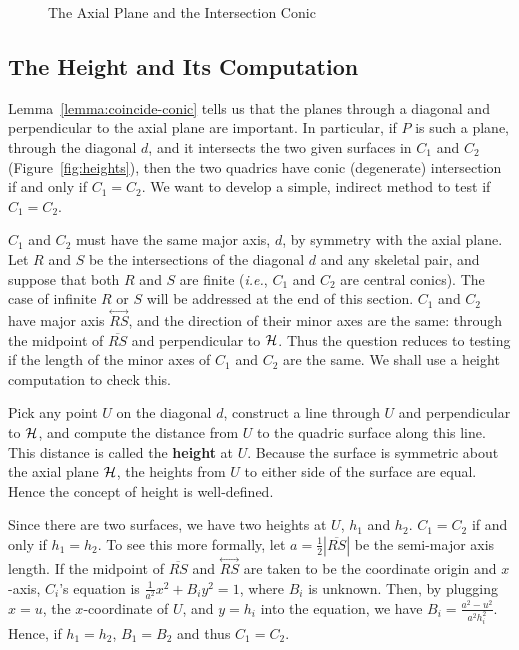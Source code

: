 \begin{figure}
\vspace{4.5cm}
\caption{The Axial Plane and the Intersection Conic}
\label{fig:major}
\end{figure}




\subsection{The Height and Its Computation}
\label{section:height}

     Lemma~\ref{lemma:coincide-conic} tells us that the planes through a
diagonal and perpendicular to the axial plane are important.
In particular, if $P$ is such a plane,
through the diagonal $d$, and it intersects
the two given surfaces in $C_1$ and $C_2$ (Figure~\ref{fig:heights}),
then the two quadrics have conic (degenerate) intersection if and only if
$C_1 = C_2$.
We want to develop a simple, indirect method to test if $C_1=C_2$.

$C_1$ and $C_2$ must have
the same major axis, $d$, by symmetry with the axial plane.
Let $R$ and $S$ be the intersections of the diagonal $d$ and
any skeletal pair, and suppose that both $R$ and $S$ are finite
({\em i.e.}, $C_1$ and $C_2$ are central conics).
The case of infinite $R$ or $S$ will be addressed at the end of this section.
$C_1$ and $C_2$ have major axis $\stackrel{\longleftrightarrow}{RS}$,
and the direction of
their minor axes are the same: through the midpoint of $\overline{RS}$ and
perpendicular to ${\cal H}$.  Thus the question reduces
to testing if the length of the minor axes of $C_1$ and $C_2$ are the
same.  We shall use a height computation to check this.

\begin{definition}
\label{defn:height}
Pick any point $U$ on the diagonal $d$,
construct a line  through $U$ and perpendicular to ${\cal H}$, and compute
the distance from $U$ to the quadric surface along this line.
This distance is called the {\bf height} at $U$.
Because the surface is symmetric about the
axial plane ${\cal H}$, the heights from $U$ to either side of the surface
are equal.  Hence the concept of height is well-defined.
\end{definition}

Since there are
two surfaces, we have two heights at $U$, $h_1$ and $h_2$.
$C_1=C_2$ if and only if $h_1=h_2$.  To see this more formally,
let $a=\frac{1}{2}|\overline{RS}|$ be the
semi-major axis length.  If the midpoint of $\overline{RS}$ and
$\stackrel{\longleftrightarrow}{RS}$
are taken to be
the coordinate origin and $x$-axis,
$C_i$'s equation is $\frac{1}{a^2}{x^2}+B_iy^2=1$,
where $B_i$ is unknown.  Then, by plugging $x=u$, the $x$-coordinate of $U$,
and $y=h_i$ into the equation, we have $B_i=\frac{a^2-u^2}{a^2h_i^2}$.
Hence, if $h_1=h_2$, $B_1=B_2$ and thus $C_1=C_2$.

